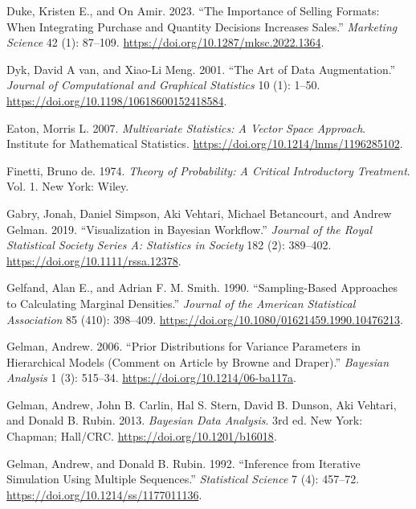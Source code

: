 \documentclass[
  11pt,
  letterpaper,
]{scrbook}
\newlength{\cslhangindent}
\newenvironment{CSLReferences}[2] %
 {\begin{list}{}{%
  \setlength{\itemindent}{0pt}
  \setlength{\leftmargin}{0pt}
  \setlength{\parsep}{0pt}
  \ifodd #1
   \setlength{\leftmargin}{\cslhangindent}
   \setlength{\itemindent}{-1\cslhangindent}
  \fi
  \setlength{\itemsep}{#2\baselineskip}}}
 {\end{list}}
\theoremstyle{plain}
\theoremstyle{definition}
\theoremstyle{definition}
\theoremstyle{plain}
\theoremstyle{plain}
\theoremstyle{definition}
\theoremstyle{remark}
\begin{document}
\begin{CSLReferences}{1}{0}
Duke, Kristen E., and On Amir. 2023. {``The Importance of Selling
Formats: When Integrating Purchase and Quantity Decisions Increases
Sales.''} \emph{Marketing Science} 42 (1): 87--109.
\url{https://doi.org/10.1287/mksc.2022.1364}.

Dyk, David A van, and Xiao-Li Meng. 2001. {``The Art of Data
Augmentation.''} \emph{Journal of Computational and Graphical
Statistics} 10 (1): 1--50.
\url{https://doi.org/10.1198/10618600152418584}.

Eaton, Morris L. 2007. \emph{Multivariate Statistics: A Vector Space
Approach}. Institute for Mathematical Statistics.
\url{https://doi.org/10.1214/lnms/1196285102}.

Finetti, Bruno de. 1974. \emph{Theory of Probability: A Critical
Introductory Treatment}. Vol. 1. New York: Wiley.

Gabry, Jonah, Daniel Simpson, Aki Vehtari, Michael Betancourt, and
Andrew Gelman. 2019. {``{Visualization in {B}ayesian Workflow}.''}
\emph{Journal of the Royal Statistical Society Series A: Statistics in
Society} 182 (2): 389--402. \url{https://doi.org/10.1111/rssa.12378}.

Gelfand, Alan E., and Adrian F. M. Smith. 1990. {``Sampling-Based
Approaches to Calculating Marginal Densities.''} \emph{Journal of the
American Statistical Association} 85 (410): 398--409.
\url{https://doi.org/10.1080/01621459.1990.10476213}.

Gelman, Andrew. 2006. {``Prior Distributions for Variance Parameters in
Hierarchical Models (Comment on Article by {B}rowne and {D}raper).''}
\emph{Bayesian Analysis} 1 (3): 515--34.
\url{https://doi.org/10.1214/06-ba117a}.

Gelman, Andrew, John B. Carlin, Hal S. Stern, David B. Dunson, Aki
Vehtari, and Donald B. Rubin. 2013. \emph{Bayesian Data Analysis}. 3rd
ed. New York: Chapman; Hall/CRC. \url{https://doi.org/10.1201/b16018}.

Gelman, Andrew, and Donald B. Rubin. 1992. {``Inference from Iterative
Simulation Using Multiple Sequences.''} \emph{Statistical Science} 7
(4): 457--72. \url{https://doi.org/10.1214/ss/1177011136}.


\end{CSLReferences}
\end{document}
